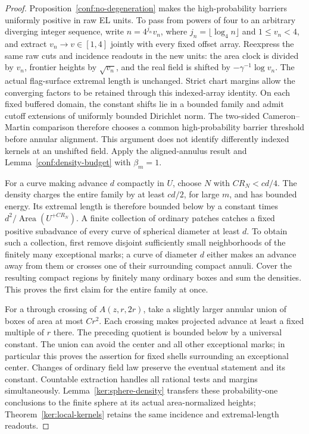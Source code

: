 \documentclass[11pt]{article}
\numberwithin{equation}{section}
\theoremstyle{definition}
\theoremstyle{remark}
\newcommand{\1}{\mathbf 1}
\DeclareMathOperator{\Area}{Area}
\begin{document}
\begin{proof}
Proposition~\ref{conf:no-degeneration} makes the high-probability
barriers uniformly positive in raw EL units. To pass from powers of four
to an arbitrary diverging integer sequence, write
$n=4^{j_n}v_n$, where $j_n=\lfloor\log_4 n\rfloor$ and $1\le v_n<4$,
and extract $v_n\to v\in[1,4]$ jointly with every fixed offset array.
Reexpress the same raw cuts and incidence readouts in the new units:
the area clock is divided by $v_n$, frontier heights by $\sqrt{v_n}$,
and the real field is shifted by $-\gamma^{-1}\log v_n$.
The actual flag-surface extremal length is unchanged. Strict chart
margins allow the converging factors to be retained through this
indexed-array identity. On each fixed buffered domain, the constant
shifts lie in a bounded family and admit cutoff extensions of uniformly
bounded Dirichlet norm. The two-sided Cameron--Martin comparison
therefore chooses a common high-probability barrier threshold before
annular alignment. This argument does not identify differently indexed
kernels at an unshifted field. Apply the aligned-annulus result and
Lemma~\ref{conf:density-budget} with \(\beta_m=1\).

For a curve making advance \(d\) compactly in \(U\), choose \(N\)
with \(CR_N<cd/4\).  The density charges the entire family by at
least \(cd/2\), for large \(m\), and has bounded energy.  Its
extremal length is therefore bounded below by a constant times
\(d^2/\Area(U^{+CR_N})\).  A finite collection of ordinary patches
catches a fixed positive subadvance of every curve of spherical
diameter at least \(d\).  To obtain such a collection, first remove
disjoint sufficiently small neighborhoods of the finitely many
exceptional marks; a curve of diameter \(d\) either makes an
advance away from them or crosses one of their surrounding compact
annuli.  Cover the resulting compact regions by finitely many
ordinary boxes and sum the densities.  This proves the first claim
for the entire family at once.

For a through crossing of \(A(z,r,2r)\), take a slightly larger
annular union of boxes of area at most \(Cr^2\).  Each crossing
makes projected advance at least a fixed multiple of \(r\) there.
The preceding quotient is bounded below by a universal constant.
The union can avoid the center and all other exceptional marks; in
particular this proves the assertion for fixed shells surrounding
an exceptional center.  Changes of ordinary field law preserve the
eventual statement and its constant.  Countable extraction handles
all rational tests and margins simultaneously. Lemma~\ref{ker:sphere-density}
transfers these probability-one conclusions to the finite sphere at its
actual area-normalized heights; Theorem~\ref{ker:local-kernels} retains
the same incidence and extremal-length readouts.
\end{proof}
\end{document}
